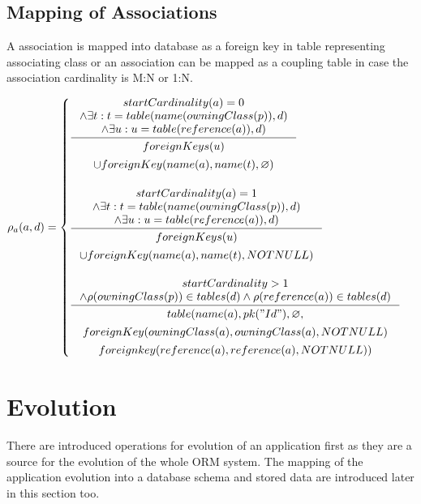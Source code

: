 \documentclass[11pt]{article}
\begin{document}
\subsection{Mapping of Associations}
A association is mapped into database as a foreign key in table representing associating class or an association can be mapped as a coupling table in case the association cardinality is M:N or 1:N.

$
\rho_a(a,d) = \begin{cases}
 \inference{ startCardinality(a) = 0 \\ \wedge \exists t : t = table(name(owningClass(p)), d) \\ \wedge \exists u : u = table(reference(a)), d)}{ 
 \begin{gathered}
 foreignKeys(u) \\ \cup foreignKey(name(a), name(t),  \varnothing) 
 \end{gathered}
 }
  \\ \\
 \inference{ startCardinality(a) = 1 \\ \wedge \exists t : t = table(name(owningClass(p)), d) \\ \wedge \exists u : u = table(reference(a)), d)}{\begin{gathered}  
foreignKeys(u) \\ \cup  foreignKey(name(a), name(t),  NOTNULL) \\
\end{gathered}
} \\ \\
 
  \inference{  startCardinality > 1 \\ \wedge \rho(owningClass(p)) \in tables(d) \wedge \rho(reference(a)) \in tables(d)}{
  \begin{gathered}  
 table(name(a), pk("Id"), \varnothing, \\ foreignKey(owningClass(a),owningClass(a), NOTNULL) \\ foreignkey(reference(a), reference(a), NOTNULL)) 
  \end{gathered}}  
 \end{cases}
$

\section{Evolution}
\label{sec:eorm}
There are introduced operations for evolution of an application first as they are a source for the evolution of the whole ORM system. The mapping of the application evolution into a database schema and stored data are introduced later in this section too.
\end{document}
